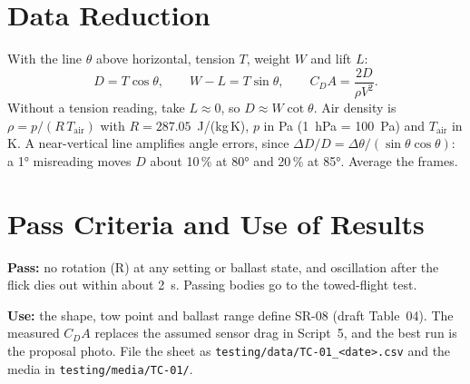 \documentclass[final]{dbfdoc}
\begin{document}
\section{Data Reduction}
With the line $\theta$ above horizontal, tension $T$, weight $W$ and lift $L$:
\begin{equation}
D = T\cos\theta, \qquad W - L = T\sin\theta, \qquad C_D A = \frac{2D}{\rho V^2} .
\end{equation}
Without a tension reading, take $L \approx 0$, so $D \approx W\cot\theta$. Air density is $\rho = p/(R\,T_\mathrm{air})$ with $R = 287.05$~J/(kg\,K), $p$ in Pa (1~hPa = 100~Pa) and $T_\mathrm{air}$ in K. A near-vertical line amplifies angle errors, since $\Delta D/D = \Delta\theta/(\sin\theta\cos\theta)$: a 1° misreading moves $D$ about 10\,\% at 80° and 20\,\% at 85°. Average the frames.

\section{Pass Criteria and Use of Results}
\textbf{Pass:} no rotation (R) at any setting or ballast state, and oscillation after the flick dies out within about 2~s. Passing bodies go to the towed-flight test.

\textbf{Use:} the shape, tow point and ballast range define SR-08 (draft Table~04). The measured $C_D A$ replaces the assumed sensor drag in Script~5, and the best run is the proposal photo. File the sheet as \texttt{testing/data/TC-01\_<date>.csv} and the media in \texttt{testing/media/TC-01/}.
\end{document}
